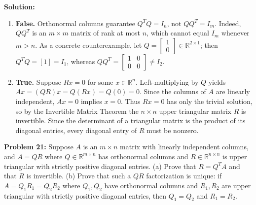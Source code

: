 \documentclass[11pt, letterpaper]{article}
\theoremstyle{definition}
\theoremstyle{remark}
\begin{document}
\textbf{Solution:}
\begin{enumerate}[label=(\alph*)]
    \item \textbf{False.} Orthonormal columns guarantee $Q^T Q = I_n$, not $Q Q^T = I_m$. Indeed, $Q Q^T$ is an $m \times m$ matrix of rank at most $n$, which cannot equal $I_m$ whenever $m > n$. As a concrete counterexample, let $Q = \begin{bmatrix} 1 \\ 0 \end{bmatrix} \in \mathbb{R}^{2 \times 1}$; then $Q^T Q = {[1]} = I_1$, whereas $Q Q^T = \begin{bmatrix} 1 & 0 \\ 0 & 0 \end{bmatrix} \neq I_2$.
    \item \textbf{True.} Suppose $Rx = 0$ for some $x \in \mathbb{R}^n$. Left-multiplying by $Q$ yields $Ax = (QR)x = Q(Rx) = Q(0) = 0$. Since the columns of $A$ are linearly independent, $Ax = 0$ implies $x = 0$. Thus $Rx = 0$ has only the trivial solution, so by the Invertible Matrix Theorem the $n \times n$ upper triangular matrix $R$ is invertible. Since the determinant of a triangular matrix is the product of its diagonal entries, every diagonal entry of $R$ must be nonzero.
\end{enumerate}

\vspace{0.8em}

\textbf{Problem 21:} Suppose $A$ is an $m \times n$ matrix with linearly independent columns, and $A = QR$ where $Q \in \mathbb{R}^{m \times n}$ has orthonormal columns and $R \in \mathbb{R}^{n \times n}$ is upper triangular with strictly positive diagonal entries.
(a) Prove that $R = Q^T A$ and that $R$ is invertible.
(b) Prove that such a $QR$ factorization is unique: if $A = Q_1 R_1 = Q_2 R_2$ where $Q_1, Q_2$ have orthonormal columns and $R_1, R_2$ are upper triangular with strictly positive diagonal entries, then $Q_1 = Q_2$ and $R_1 = R_2$.
\end{document}
